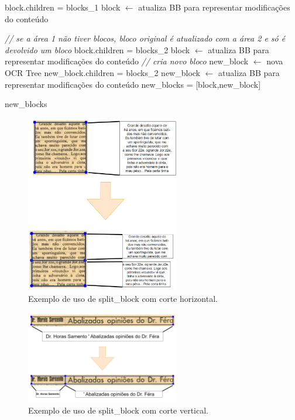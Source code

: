 \begin{breakablealgorithm}
\begin{algorithmic}[1]
			\State block.children = blocks\_1
			\State block $\leftarrow$ atualiza BB para representar modificações do conteúdo
			
		\Else
			\State \textit{// se a área 1 não tiver blocos, bloco original é atualizado com a área 2 e só é devolvido um bloco}
				\State block.children = blocks\_2
				\State block $\leftarrow$ atualiza BB para representar modificações do conteúdo
			\Else
				\State \textit{// cria novo bloco}
				\State new\_block $\leftarrow$ nova OCR Tree
				\State new\_block.children = blocks\_2
				\State new\_block $\leftarrow$ atualiza BB para representar modificações do conteúdo
				\State new\_blocks = [block,new\_block]
				
			\EndIf
			
		\EndIf
		
		\Return new\_blocks
		
	\end{algorithmic}
\end{breakablealgorithm}


\begin{figure}[H]
	\centering
	\includegraphics[width=0.6\textwidth]{images/ilustracoes/split_block_horizontal.png}
	\caption{Exemplo de uso de split\_block com corte horizontal.}
	\label{fig:split_block_horizontal}
\end{figure}

\begin{figure}[H]
	\centering
	\includegraphics[width=0.6\textwidth]{images/ilustracoes/split_block_vertical.png}
	\caption{Exemplo de uso de split\_block com corte vertical.}
	\label{fig:split_block_vertical}
\end{figure}




